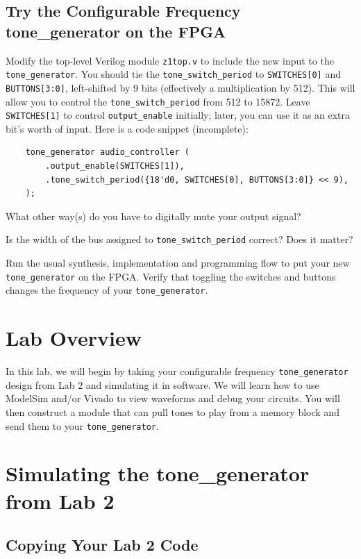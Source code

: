\documentclass[11pt]{article}
\begin{document}
\subsection{Try the Configurable Frequency tone\_generator on the FPGA}
Modify the top-level Verilog module \verb|z1top.v| to include the new input to the \verb|tone_generator|. You should tie the \verb|tone_switch_period| to \verb|SWITCHES[0]| and \verb|BUTTONS[3:0]|, left-shifted by 9 bits (effectively a multiplication by 512). This will allow you to control the \verb|tone_switch_period| from 512 to 15872. Leave \verb|SWITCHES[1]| to control \verb|output_enable| initially; later, you can use it as an extra bit's worth of input. Here is a code snippet (incomplete):

\begin{verbatim}
    tone_generator audio_controller (
        .output_enable(SWITCHES[1]),
        .tone_switch_period({18'd0, SWITCHES[0], BUTTONS[3:0]} << 9),
    );
\end{verbatim}

What other way(s) do you have to digitally mute your output signal?

Is the width of the bus assigned to \verb|tone_switch_period| correct? Does it matter?

Run the usual synthesis, implementation and programming flow to put your new \verb|tone_generator| on the FPGA. Verify that toggling the switches and buttons changes the frequency of your \verb|tone_generator|.

\section{Lab Overview}

In this lab, we will begin by taking your configurable frequency \verb|tone_generator| design from Lab 2 and simulating it in software. We will learn how to use ModelSim and/or Vivado to view waveforms and debug your circuits. You will then construct a module that can pull tones to play from a memory block and send them to your \verb|tone_generator|.

\section{Simulating the tone\_generator from Lab 2}

\subsection{Copying Your Lab 2 Code}
\end{document}
